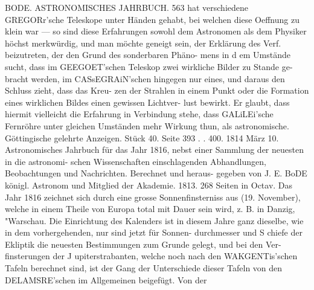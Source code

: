 \documentclass[12pt,a4paper]{article}
\begin{document}
\newpage
BODE. ASTRONOMISCHES JAHRBUCH. 563\newline
hat verschiedene GREGORr'sche Teleskope unter Händen gehabt, bei welchen diese Oeffnung zu klein\newline
war --- so sind diese Erfahrungen sowohl dem Astronomen als dem Physiker höchst merkwürdig, und\newline
man möchte geneigt sein, der Erklärung des Verf. beizutreten, der den Grund des sonderbaren Phäno-\newline
mens in d em Umstände sucht, dass im GEEGOET'schen Teleskop zwei wirkliche Bilder zu Stande ge-\newline
bracht werden, im CASsEGRAiN'schen hingegen nur eines, und daraus den Schluss zieht, dass das Kreu-\newline
zen der Strahlen in einem Punkt oder die Formation eines wirklichen Bildes einen gewissen Lichtver-\newline
lust bewirkt. Er glaubt, dass hiermit vielleicht die Erfahrung in Verbindung stehe, dass GALiLEi'sche\newline
Fernröhre unter gleichen Umständen mehr Wirkung thun, als astronomische.\newline
Göttingische gelehrte Anzeigen. Stück 40. Seite 393 . . 400. 1814 März 10.\newline
Astronomisches Jahrbuch für das Jahr 1816, nebst einer Sammlung der neuesten in die astronomi-\newline
schen Wissenschaften einschlagenden Abhandlungen, Beobachtungen und Nachrichten. Berechnet und heraus-\newline
gegeben von J. E. BoDE königl. Astronom und Mitglied der Akademie. 1813. 268 Seiten in Octav.\newline
Das Jahr 1816 zeichnet sich durch eine grosse Sonnenfinsterniss aus (19. November), welche in\newline
einem Theile von Europa total mit Dauer sein wird, z. B. in Danzig, "Warschau. Die Einrichtung des\newline
Kalenders ist in diesem Jahre ganz dieselbe, wie in dem vorhergehenden, nur sind jetzt für Sonnen-\newline
durchmesser und S chiefe der Ekliptik die neuesten Bestimmungen zum Grunde gelegt, und bei den Ver-\newline
finsterungen der J upiterstrabanten, welche noch nach den WAKGENTis'schen Tafeln berechnet sind, ist\newline
der Gang der Unterschiede dieser Tafeln von den DELAMSRE'schen im Allgemeinen beigefügt. Von der\newline
\end{document}
